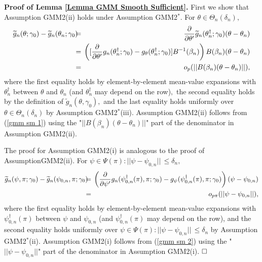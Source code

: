 \documentclass[12pt,titlepage,final,oneside,letterpaper]{article}
\begin{document}
\noindent \textbf{Proof of Lemma \ref{Lemma GMM Smooth Sufficient}.} First
we show that Assumption GMM2(ii) holds under Assumption GMM2$^{\ast }$. For $%
\theta \in \Theta _{n}(\delta _{n}),$%
\begin{eqnarray}
\widetilde{g}_{n}(\theta ;\gamma _{0})-\widetilde{g}_{n}(\theta _{n};\gamma
_{0})\hspace{-0.08in} &=&\hspace{-0.08in}\frac{\partial }{\partial \theta
^{\prime }}\widetilde{g}_{n}(\theta _{n}^{\dag };\gamma _{0})(\theta -\theta
_{n})  \notag \\
&=&\hspace{-0.08in}\left( [\frac{\partial }{\partial \theta ^{\prime }}%
g_{n}(\theta _{n}^{\dag };\gamma _{0})-g_{\theta }(\theta _{n}^{\dag
};\gamma _{0})]B^{-1}(\beta _{n})\right) B(\beta _{n})(\theta -\theta _{n}) 
\notag \\
&=&\hspace{-0.08in}o_{p}(||B(\beta _{n})(\theta -\theta _{n})||),
\label{gmm sm 1}
\end{eqnarray}%
where the first equality holds by element-by-element mean-value expansions
with $\theta _{n}^{\dag }$ between $\theta $ and $\theta _{n}$ (and $\theta
_{n}^{\dag }$ may depend on the row)$,$ the second equality holds by the
definition of $\widetilde{g}_{n}(\theta ,\gamma _{0}),$ and the last
equality holds uniformly over $\theta \in \Theta _{n}(\delta _{n})$ by
Assumption GMM2$^{\ast }$(iii). Assumption GMM2(ii) follows from (\ref{gmm
sm 1}) using the "$||B(\beta _{n})(\theta -\theta _{n})||$" part of the
denominator in Assumption GMM2(ii).

The proof for Assumption GMM2(i) is analogous to the proof of
Assumption\linebreak GMM2(ii). For $\psi \in \Psi (\pi ):||\psi -\psi
_{0,n}||\,\leq \delta _{n},$%
\begin{eqnarray}
\widetilde{g}_{n}(\psi ,\pi ;\gamma _{0})-\widetilde{g}_{n}(\psi _{0,n},\pi
;\gamma _{0})\hspace{-0.08in} &=&\hspace{-0.08in}\left( \frac{\partial }{%
\partial \psi ^{\prime }}g_{n}(\psi _{0,n}^{\dag }(\pi ),\pi ;\gamma
_{0})-g_{\psi }(\psi _{0,n}^{\dag }(\pi ),\pi ;\gamma _{0})\right) (\psi
-\psi _{0,n})  \notag \\
&=&\hspace{-0.08in}o_{p\pi }(||\psi -\psi _{0,n}||),  \label{gmm sm 2}
\end{eqnarray}%
where the first equality holds by element-by-element mean-value expansions
with $\psi _{0,n}^{\dag }(\pi )$ between $\psi $ and $\psi _{0,n}$ (and $%
\psi _{0,n}^{\dag }(\pi )$ may depend on the row), and the second equality
holds uniformly over $\psi \in \Psi (\pi ):||\psi -\psi _{0,n}||\,\leq
\delta _{n}$ by Assumption GMM2$^{\ast }$(ii). Assumption GMM2(i) follows
from (\ref{gmm sm 2}) using the "$||\psi -\psi _{0,n}||$" part of the
denominator in Assumption GMM2(i). $\square \bigskip $
\end{document}
